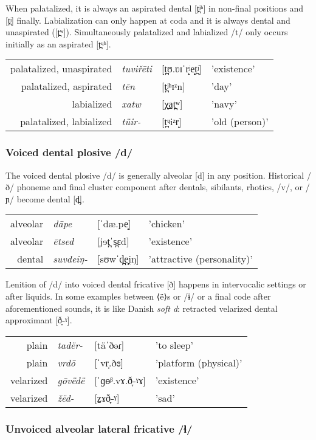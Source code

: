 When palatalized, it is always an aspirated dental [t̪ʲʰ] in non-final positions and [t̪ʲ] finally. 
Labialization can only happen at coda and it is always dental and unaspirated ([t̪ʷ]). 
Simultaneously palatalized and labialized /t/ only occurs initially as an aspirated [t̪ᶣʰ].

\begin{tabular}{rlll}
palatalized, unaspirated & \textit{tuviřēti}   & {[}t̪ʊ.ʋɪˈr̝ʲe̝t̪ʲ{]}     & 'existence' \\
palatalized, aspirated & \textit{tēn}   & {[}t̪ʲʰɪᶻn{]}     & 'day' \\
labialized & \textit{xatw}   & {[}χ̠a̠t̪ʷ{]}     & 'navy' \\
palatalized, labialized & \textit{tüir-}   & {[}t̪ᶣiᶻr̝{]}     & 'old (person)' \\
\end{tabular}

\subsubsection{Voiced dental plosive /d/}
The voiced dental plosive /d/ is generally alveolar [d] in any position. 
Historical /ð/ phoneme and final cluster component after dentals, sibilants, rhotics, /v/, or /ɲ/ become dental [d̪].

\begin{tabular}{rlll}
alveolar & \textit{dāpe}   & {[}ˈdæ.pe̝{]}     & 'chicken' \\
alveolar & \textit{ētsed}   & {[}jɘt̪ˈs̪ɛd{]}     & 'existence' \\
dental & \textit{suvdeiŋ-}   & {[}sʊwˈd̪e̞i̯ŋ{]}     & 'attractive (personality)' \\
\end{tabular}

Lenition of /d/ into voiced dental fricative [ð] happens in intervocalic settings or after liquids.
In some examples between ⟨ë⟩s or /ɨ/ or a final code after aforementioned sounds, 
it is like Danish \textit{soft d}: retracted velarized dental approximant [ð̞˗ˠ].

\begin{tabular}{rlll}
plain & \textit{tadër-}   & {[}täˈðəɾ{]}     & 'to sleep' \\
plain & \textit{vrdō}   & {[}ˈvr̩.ðɞ{]}     & 'platform (physical)' \\
velarized & \textit{gōvëdë}   & {[}ˈɡɵᵝ.vɤ.ð̞˗ˠɤ{]}     & 'existence' \\
velarized & \textit{žëd-}   & {[}z̠ɤð̞˗ˠ{]}     & 'sad' \\
\end{tabular}

\subsubsection{Unvoiced alveolar lateral fricative /ɬ/}
